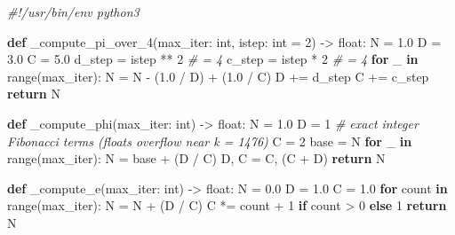 \documentclass[12pt]{article}
\newenvironment{Shaded}{}{}
\newcommand{\BuiltInTok}[1]{\textcolor[rgb]{0.00,0.50,0.00}{#1}}
\newcommand{\CommentTok}[1]{\textcolor[rgb]{0.38,0.63,0.69}{\textit{#1}}}
\newcommand{\ControlFlowTok}[1]{\textcolor[rgb]{0.00,0.44,0.13}{\textbf{#1}}}
\newcommand{\DecValTok}[1]{\textcolor[rgb]{0.25,0.63,0.44}{#1}}
\newcommand{\FloatTok}[1]{\textcolor[rgb]{0.25,0.63,0.44}{#1}}
\newcommand{\KeywordTok}[1]{\textcolor[rgb]{0.00,0.44,0.13}{\textbf{#1}}}
\newcommand{\NormalTok}[1]{#1}
\newcommand{\OperatorTok}[1]{\textcolor[rgb]{0.40,0.40,0.40}{#1}}
\begin{document}
\begin{Shaded}
\begin{Highlighting}[]
\CommentTok{\#!/usr/bin/env python3}

\KeywordTok{def}\NormalTok{ \_compute\_pi\_over\_4(max\_iter: }\BuiltInTok{int}\NormalTok{, istep: }\BuiltInTok{int} \OperatorTok{=} \DecValTok{2}\NormalTok{) }\OperatorTok{{-}\textgreater{}} \BuiltInTok{float}\NormalTok{:}
\NormalTok{    N }\OperatorTok{=} \FloatTok{1.0}
\NormalTok{    D }\OperatorTok{=} \FloatTok{3.0}
\NormalTok{    C }\OperatorTok{=} \FloatTok{5.0}
\NormalTok{    d\_step }\OperatorTok{=}\NormalTok{ istep }\OperatorTok{**} \DecValTok{2}      \CommentTok{\# = 4}
\NormalTok{    c\_step }\OperatorTok{=}\NormalTok{ istep }\OperatorTok{*} \DecValTok{2}       \CommentTok{\# = 4}
    \ControlFlowTok{for}\NormalTok{ \_ }\KeywordTok{in} \BuiltInTok{range}\NormalTok{(max\_iter):}
\NormalTok{        N }\OperatorTok{=}\NormalTok{ N }\OperatorTok{{-}}\NormalTok{ (}\FloatTok{1.0} \OperatorTok{/}\NormalTok{ D) }\OperatorTok{+}\NormalTok{ (}\FloatTok{1.0} \OperatorTok{/}\NormalTok{ C)}
\NormalTok{        D }\OperatorTok{+=}\NormalTok{ d\_step}
\NormalTok{        C }\OperatorTok{+=}\NormalTok{ c\_step}
    \ControlFlowTok{return}\NormalTok{ N}


\KeywordTok{def}\NormalTok{ \_compute\_phi(max\_iter: }\BuiltInTok{int}\NormalTok{) }\OperatorTok{{-}\textgreater{}} \BuiltInTok{float}\NormalTok{:}
\NormalTok{    N }\OperatorTok{=} \FloatTok{1.0}
\NormalTok{    D }\OperatorTok{=} \DecValTok{1}   \CommentTok{\# exact integer Fibonacci terms (floats overflow near k = 1476)}
\NormalTok{    C }\OperatorTok{=} \DecValTok{2}
\NormalTok{    base }\OperatorTok{=}\NormalTok{ N}
    \ControlFlowTok{for}\NormalTok{ \_ }\KeywordTok{in} \BuiltInTok{range}\NormalTok{(max\_iter):}
\NormalTok{        N }\OperatorTok{=}\NormalTok{ base }\OperatorTok{+}\NormalTok{ (D }\OperatorTok{/}\NormalTok{ C)}
\NormalTok{        D, C }\OperatorTok{=}\NormalTok{ C, (C }\OperatorTok{+}\NormalTok{ D)}
    \ControlFlowTok{return}\NormalTok{ N}


\KeywordTok{def}\NormalTok{ \_compute\_e(max\_iter: }\BuiltInTok{int}\NormalTok{) }\OperatorTok{{-}\textgreater{}} \BuiltInTok{float}\NormalTok{:}
\NormalTok{    N }\OperatorTok{=} \FloatTok{0.0}
\NormalTok{    D }\OperatorTok{=} \FloatTok{1.0}
\NormalTok{    C }\OperatorTok{=} \FloatTok{1.0}
    \ControlFlowTok{for}\NormalTok{ count }\KeywordTok{in} \BuiltInTok{range}\NormalTok{(max\_iter):}
\NormalTok{        N }\OperatorTok{=}\NormalTok{ N }\OperatorTok{+}\NormalTok{ (D }\OperatorTok{/}\NormalTok{ C)}
\NormalTok{        C }\OperatorTok{*=}\NormalTok{ count }\OperatorTok{+} \DecValTok{1} \ControlFlowTok{if}\NormalTok{ count }\OperatorTok{\textgreater{}} \DecValTok{0} \ControlFlowTok{else} \DecValTok{1}
    \ControlFlowTok{return}\NormalTok{ N}



\end{Highlighting}
\end{Shaded}
\end{document}

